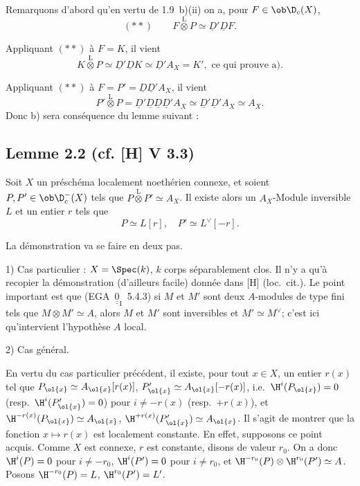 Remarquons d'abord qu'en vertu de 1.9~b)(ii) on a, pour $F \in \ob \D_c(X)$,
\[
(**) \qquad F \mathop{\otimes}\limits^{\mathrm{L}} P \simeq \underline{D}'\underline{D} F.
\]

Appliquant $(**)$ à $F = K$, il vient
\[
K \mathop{\otimes}\limits^{\mathrm{L}} P \simeq \underline{D}'\underline{D} K \simeq \underline{D}' A_X = K', \text{ ce qui prouve a).}
\]

Appliquant $(**)$ à $F = P' = \underline{D}\underline{D}'A_X$, il vient
\[
P' \mathop{\otimes}\limits^{\mathrm{L}} P = \underline{D}'\underline{D}\underline{D}\underline{D}'A_X \simeq \underline{D}'\underline{D}'A_X \simeq A_X.
\]
Donc b) sera conséquence du lemme suivant :

\subsection*{Lemme 2.2 (cf. [H] V 3.3)}
Soit $X$ un préschéma localement noethérien connexe, et soient $P, P' \in \ob \D_c^{-}(X)$ tels que $P \mathop{\otimes}\limits^{\mathrm{L}} P' \simeq A_X$. Il existe alors un $A_X$-Module inversible $L$ et un entier $r$ tels que
\[
P \simeq L[r], \quad P' \simeq L^{\vee}[-r].
\]

La démonstration va se faire en deux pas.

1) Cas particulier : $X = \Spec(k)$, $k$ corps séparablement clos. Il n'y a qu'à recopier la démonstration (d'ailleurs facile) donnée dans [H] (loc.~cit.). Le point important est que (EGA~$\underline{\underline{0}}_{\mathrm{I}}$~5.4.3) si $M$ et $M'$ sont deux $A$-modules de type fini tels que $M \otimes M' \simeq A$, alors $M$ et $M'$ sont inversibles et $M' \simeq M^{\vee}$; c'est ici qu'intervient l'hypothèse $A$ local.

2) Cas général.

En vertu du cas particulier précédent, il existe, pour tout $x \in X$, un entier $r(x)$ tel que $P_{\ol{x}} \simeq A_{\ol{x}}[r(x)]$, $P'_{\ol{x}} \simeq A_{\ol{x}}[-r(x)]$, i.e.~$\H^i(P_{\ol{x}}) = 0$ (resp.~$\H^i(P'_{\ol{x}}) = 0$) pour $i \neq -r(x)$ (resp.~$+r(x)$), et $\H^{-r(x)}(P_{\ol{x}}) \simeq A_{\ol{x}}$, $\H^{+r(x)}(P'_{\ol{x}}) \simeq A_{\ol{x}}$. Il s'agit de montrer que la fonction $x \mapsto r(x)$ est localement constante. En effet, supposons ce
point acquis. Comme $X$ est connexe, $r$ est constante, disons de valeur $r_0$. On a donc $\H^i(P) = 0$ pour $i \neq -r_0$, $\H^i(P') = 0$ pour $i \neq r_0$, et $\H^{-r_0}(P) \otimes \H^{r_0}(P') \simeq A$. Posons $\H^{-r_0}(P) = L$, $\H^{r_0}(P') = L'$.

